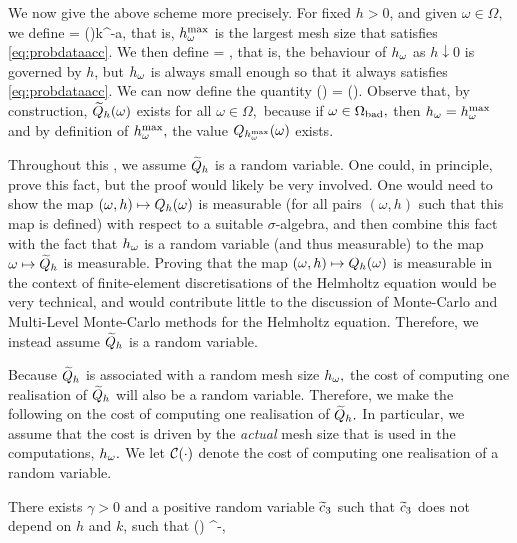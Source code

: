 We now give the above scheme more precisely. For fixed $h>0$, and given $\omega \in \Omega,$ we define
\beq\label{eq:hmaxomega}
\hmaxomega = \Co(\omega)k^{-a},
\eeq
that is, $h^{\max}_{\omega}$ is the largest mesh size that satisfies \cref{eq:probdataacc}. We then define
\beq\label{eq:homega}
\homega = \min{},
\eeq
that is, the behaviour of $h_{\omega}$ as $h\downarrow 0$ is governed by $h$, but $h_{\omega}$ is always small enough so that it always satisfies \cref{eq:probdataacc}. We can now define the quantity
\beq\label{eq:Qhtilde}
\Qhtilde(\omega) = \Qhomega(\omega).
\eeq
Observe that, by construction, $\widetilde{Q}_{h}(\omega)$ exists for all $\omega \in \Omega,$ because if $\omega \in \Omega_{\mathrm{bad}},$ then $h_{\omega} = h^{\max}_{\omega}$ and by definition of $h^{\max}_{\omega},$ the value $Q_{h^{\max}_{\omega}}(\omega)$ exists.

\label{rem:Qhtilderandom}
Throughout this , we assume $\widetilde{Q}_{h}$ is a random variable. One could, in principle, prove this fact, but the proof would likely be very involved. One would need to show the map $(\omega,h) \mapsto Q_{h}(\omega)$ is measurable (for all pairs $(\omega,h)$ such that this map is defined) with respect to a suitable $\sigma$-algebra, and then combine this fact with the fact that $h_{\omega}$ is a random variable (and thus measurable) to the map $\omega \mapsto \widetilde{Q}_{h}$ is measurable. Proving that the map $(\omega,h) \mapsto Q_{h}(\omega)$ is measurable in the context of finite-element discretisations of the Helmholtz equation would be very technical, and would contribute little to the discussion of Monte-Carlo and Multi-Level Monte-Carlo methods for the Helmholtz equation. Therefore, we instead assume $\widetilde{Q}_{h}$ is a random variable.
\ere

Because $\widetilde{Q}_{h}$ is associated with a random mesh size $h_{\omega},$ the cost of computing one realisation of $\widetilde{Q}_{h}$ will also be a random variable. Therefore, we make the following  on the cost of computing one realisation of $\widetilde{Q}_{h}.$ In particular, we assume that the cost is driven by the \emph{actual} mesh size that is used in the computations, $h_{\omega}.$ We let $\Cost{\cdot}$ denote the cost of computing one realisation of a random variable.

\label{ass:costone}
There exists $ \gamma > 0$ and a positive random variable $\widetilde{c}_{3}$ such that $\widetilde{c}_{3}$ does not depend on $h$ and $k$, such that
\beqs
\Cost{\Qhtilde(\omega)} \leq \cthtilde(\omega) \homega^{-\gamma},
\eeqs
\eas

